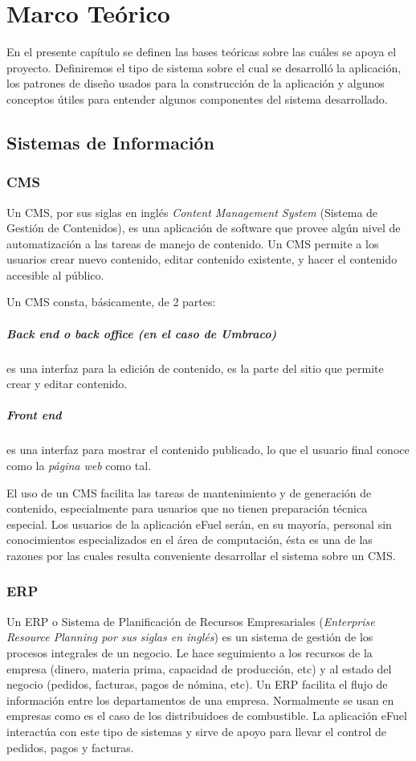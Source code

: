 \chapter{Marco Teórico}
En el presente capítulo se definen las bases teóricas sobre las cuáles se apoya el proyecto. Definiremos el tipo de sistema sobre el cual se desarrolló la aplicación, los patrones de diseño usados para la construcción de la aplicación y algunos conceptos útiles para entender algunos componentes del sistema desarrollado.

\section{Sistemas de Información}
    \subsection{CMS}
    Un CMS, por sus siglas en inglés \textit{Content Management System} (Sistema de Gestión de Contenidos), es una aplicación de software que provee algún nivel de automatización a las tareas de manejo de contenido. Un CMS permite a los usuarios crear nuevo contenido, editar contenido existente, y hacer el contenido accesible al público. \cite{cmsBarker}

    Un CMS consta, básicamente, de 2 partes:
    
    \paragraph*{Back end o back office (en el caso de Umbraco)} es una interfaz para la edición de contenido, es la parte del sitio que permite crear y editar contenido.
    \paragraph*{Front end} es una interfaz para mostrar el contenido publicado, lo que el usuario final conoce como la \emph{página web} como tal.

    El uso de un CMS facilita las tareas de mantenimiento y de generación de contenido, especialmente para usuarios que no tienen preparación técnica especial. Los usuarios de la aplicación eFuel serán, en su mayoría, personal sin conocimientos especializados en el área de computación, ésta es una de las razones por las cuales resulta conveniente desarrollar el sistema sobre un CMS.

    \subsection{ERP}
    Un ERP o Sistema de Planificación de Recursos Empresariales (\emph{Enterprise Resource Planning por sus siglas en inglés}) es un sistema de gestión de los procesos integrales de un negocio. Le hace seguimiento a los recursos de la empresa (dinero, materia prima, capacidad de producción, etc) y al estado del negocio (pedidos, facturas, pagos de nómina, etc). Un ERP facilita el flujo de información entre los departamentos de una empresa. Normalmente se usan en empresas como es el caso de los distribuidoes de combustible. La aplicación eFuel interactúa con este tipo de sistemas y sirve de apoyo para llevar el control de pedidos, pagos y facturas.

